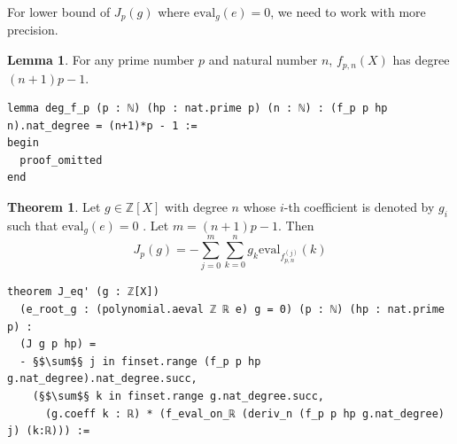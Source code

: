 \documentclass{report}
\theoremstyle{definition}
\newtheorem{lemma}{Lemma}[section]
\newtheorem{theorem}{Theorem}[section]
\begin{document}
For lower bound of $J_p(g)$ where $\mathrm{eval}_g(e)=0$, we need to work with more precision.
\begin{lemma}
For any prime number $p$ and natural number $n$, $f_{p,n}(X)$ has degree $(n+1)p-1$.
\begin{verbatim}
lemma deg_f_p (p : ℕ) (hp : nat.prime p) (n : ℕ) : (f_p p hp n).nat_degree = (n+1)*p - 1 :=
begin
  proof_omitted
end
\end{verbatim}
\end{lemma}

\begin{theorem}
Let $g\in\mathbb Z[X]$ with degree $n$ whose $i$-th coefficient is denoted by $g_i$ such that $\mathrm{eval}_g(e)=0$ . Let $m=(n+1)p-1$. Then
\begin{equation}\label{fm:important}
J_p(g)=-\sum_{j=0}^m\sum_{k=0}^n g_k\mathrm{eval}_{f_{p,n}^{(j)}}(k)  
\end{equation}

\begin{verbatim}
theorem J_eq' (g : ℤ[X]) 
  (e_root_g : (polynomial.aeval ℤ ℝ e) g = 0) (p : ℕ) (hp : nat.prime p) : 
  (J g p hp) = 
  - §$\sum$§ j in finset.range (f_p p hp g.nat_degree).nat_degree.succ,
    (§$\sum$§ k in finset.range g.nat_degree.succ,
      (g.coeff k : ℝ) * (f_eval_on_ℝ (deriv_n (f_p p hp g.nat_degree) j) (k:ℝ))) :=
\end{verbatim}
\end{theorem}
\end{document}
